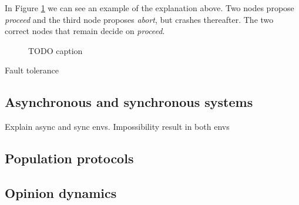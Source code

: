 In Figure \ref{fig:ConsensusProblem} we can see an example of the explanation above. Two nodes propose \emph{proceed} and the third node proposes \emph{abort}, but crashes thereafter. The two correct nodes that remain decide on \emph{proceed}.
\begin{figure}[H]
    \centering
    
    \caption{TODO caption}
    \label{fig:ConsensusProblem}
\end{figure}


Fault tolerance

\subsection{Asynchronous and synchronous systems}

Explain async and sync envs. Impossibility result in both envs

\subsection{Population protocols}



\subsection{Opinion dynamics}


